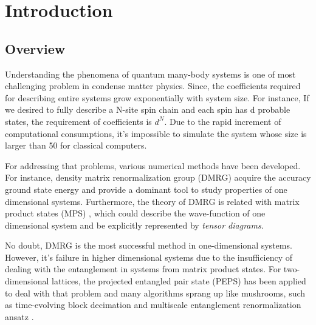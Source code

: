 \chapter{Introduction}
\label{chapter:Introduction}

\section{Overview}
\label{overview}

Understanding the phenomena of quantum many-body systems is one of most challenging problem in condense matter physics. Since, the coefficients required for describing entire systems grow exponentially with system size. For instance, If we desired to fully describe a N-site spin chain and each spin has d probable states, the requirement of coefficients is $d^N$. Due to the rapid increment of computational consumptions, it's impossible to simulate the system whose size is larger than 50 for classical computers.

For addressing that problems, various numerical methods have been developed. For instance, density matrix renormalization group (DMRG) \cite{white_density_1992} \cite{white_density-matrix_1993} acquire the accuracy ground state energy and provide a dominant tool to study properties of one dimensional systems. Furthermore, the theory of DMRG is related with matrix product states (MPS) \cite{verstraete_matrix_2006} \cite{ostlund_thermodynamic_1995} , which could describe the  wave-function of one dimensional system and be explicitly represented by \textit{tensor diagrams}.

No doubt, DMRG is the most successful method in one-dimensional systems. However, it's failure in higher dimensional systems due to the insufficiency of dealing with the entanglement in systems from matrix product states. For two-dimensional lattices, the projected entangled pair state (PEPS) \cite{murg_variational_2007} \cite{verstraete_matrix_2008} has been applied to deal with that problem and many algorithms sprang up like mushrooms, such as time-evolving block decimation \cite{vidal_efficient_2003} \cite{vidal_efficient_2004} and multiscale entanglement renormalization ansatz \cite{vidal_entanglement_2007}.
